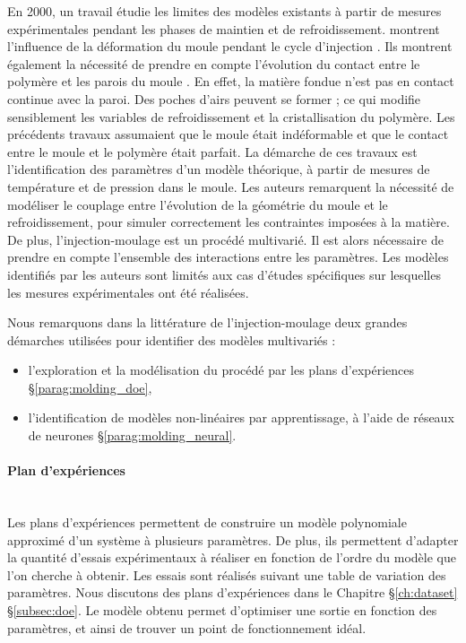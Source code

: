 En 2000, un travail étudie les limites des modèles existants à partir de mesures expérimentales pendant les phases de maintien et de refroidissement.
\citeauthor{delaunay_nature_2000} montrent l'influence de la déformation du moule pendant le cycle d'injection \cite{delaunay_nature_2000}.
Ils montrent également la nécessité de prendre en compte l'évolution du contact entre le polymère et les parois du moule \cite{delaunay_nature_2000a}.
En effet, la matière fondue n'est pas en contact continue avec la paroi.
Des poches d'airs peuvent se former ; ce qui modifie sensiblement les variables de refroidissement et la cristallisation du polymère.
Les précédents travaux assumaient que le moule était indéformable et que le contact entre le moule et le polymère était parfait.
La démarche de ces travaux est l'identification des paramètres d'un modèle théorique, à partir de mesures de température et de pression dans le moule.
Les auteurs remarquent la nécessité de modéliser le couplage entre l'évolution de la géométrie du moule et le refroidissement, pour simuler correctement les contraintes imposées à la matière.
De plus, l'injection-moulage est un procédé multivarié.
Il est alors nécessaire de prendre en compte l'ensemble des interactions entre les paramètres.
Les modèles identifiés par les auteurs sont limités aux cas d'études spécifiques sur lesquelles les mesures expérimentales ont été réalisées.

Nous remarquons dans la littérature de l'injection-moulage deux grandes démarches utilisées pour identifier des modèles multivariés :
\begin{itemize}
\item l'exploration et la modélisation du procédé par les plans d'expériences §\ref{parag:molding_doe},
\item l'identification de modèles non-linéaires par apprentissage, à l'aide de réseaux de neurones §\ref{parag:molding_neural}.
\end{itemize}

\paragraph{Plan d'expériences}\mbox{} \label{parag:molding_doe} \\
Les plans d’expériences permettent de construire un modèle polynomiale approximé d’un système à plusieurs paramètres.
De plus, ils permettent d'adapter la quantité d’essais expérimentaux à réaliser en fonction de l'ordre du modèle que l'on cherche à obtenir.
Les essais sont réalisés suivant une table de variation des paramètres.
Nous discutons des plans d'expériences dans le Chapitre §\ref{ch:dataset} §\ref{subsec:doe}.
Le modèle obtenu permet d'optimiser une sortie en fonction des paramètres, et ainsi de trouver un point de fonctionnement idéal.

